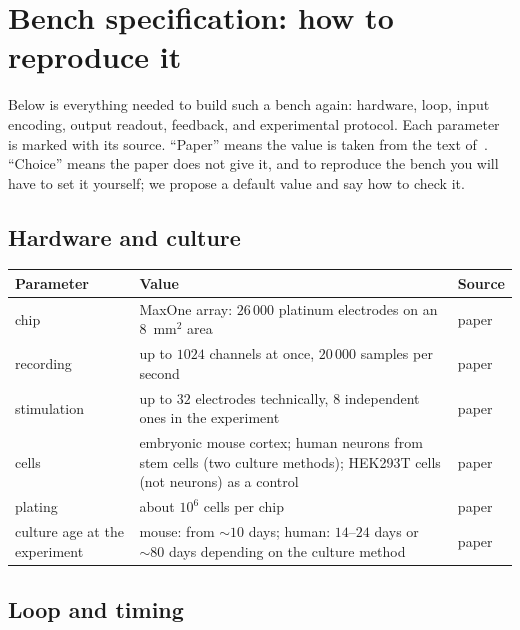 \section{Bench specification: how to reproduce it}
\label{sec:dishspec}

Below is everything needed to build such a bench again: hardware, loop, input encoding, output readout, feedback, and experimental protocol. Each parameter is marked with its source. ``Paper'' means the value is taken from the text of~\cite{Kagan2022}. ``Choice'' means the paper does not give it, and to reproduce the bench you will have to set it yourself; we propose a default value and say how to check it.

\subsection*{Hardware and culture}

\begin{center}
\footnotesize
\setlength{\tabcolsep}{4pt}
\renewcommand{\arraystretch}{1.15}
\begin{tabular}{>{\raggedright}p{4.0cm}>{\raggedright}p{6.9cm}>{\raggedright\arraybackslash}p{1.6cm}}
\toprule
Parameter & Value & Source \\
\midrule
chip & MaxOne array: $26\,000$ platinum electrodes on an $8$~mm$^2$ area & paper \\
recording & up to $1024$ channels at once, $20\,000$ samples per second & paper \\
stimulation & up to $32$ electrodes technically, $8$ independent ones in the experiment & paper \\
cells & embryonic mouse cortex; human neurons from stem cells (two culture methods); HEK293T cells (not neurons) as a control & paper \\
plating & about $10^6$ cells per chip & paper \\
culture age at the experiment & mouse: from $\sim10$ days; human: $14$--$24$ days or $\sim80$ days depending on the culture method & paper \\
\bottomrule
\end{tabular}
\end{center}

\subsection*{Loop and timing}

